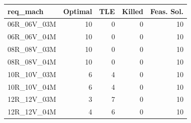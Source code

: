 
\begin{tabular}{lrrrr}
\toprule
req\_mach & Optimal & TLE & Killed & Feas. Sol.\\
\midrule
06R\_06V\_03M & 10 & 0 & 0 & 10\\
06R\_06V\_04M & 10 & 0 & 0 & 10\\
08R\_08V\_03M & 10 & 0 & 0 & 10\\
08R\_08V\_04M & 10 & 0 & 0 & 10\\
10R\_10V\_03M & 6 & 4 & 0 & 10\\
\addlinespace
10R\_10V\_04M & 6 & 4 & 0 & 10\\
12R\_12V\_03M & 3 & 7 & 0 & 10\\
12R\_12V\_04M & 4 & 6 & 0 & 10\\
\bottomrule
\end{tabular}
